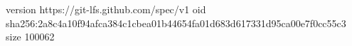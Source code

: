 version https://git-lfs.github.com/spec/v1
oid sha256:2a8c4a10f94afca384c1cbea01b44654fa01d683d617331d95ca00e7f0cc55c3
size 100062
